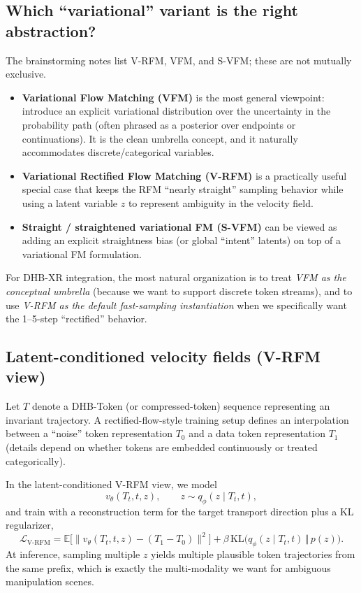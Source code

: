 \documentclass[11pt]{article}
\begin{document}
\subsection{Which ``variational'' variant is the right abstraction?}
The brainstorming notes list V-RFM, VFM, and S-VFM; these are not mutually exclusive.
\begin{itemize}
  \item \textbf{Variational Flow Matching (VFM)} is the most general viewpoint: introduce an explicit variational distribution over the uncertainty in the probability path (often phrased as a posterior over endpoints or continuations). It is the clean umbrella concept, and it naturally accommodates discrete/categorical variables.
  \item \textbf{Variational Rectified Flow Matching (V-RFM)} is a practically useful special case that keeps the RFM ``nearly straight'' sampling behavior while using a latent variable $z$ to represent ambiguity in the velocity field.
  \item \textbf{Straight / straightened variational FM (S-VFM)} can be viewed as adding an explicit straightness bias (or global ``intent'' latents) on top of a variational FM formulation.
\end{itemize}

For DHB-XR integration, the most natural organization is to treat \emph{VFM as the conceptual umbrella} (because we want to support discrete token streams), and to use \emph{V-RFM as the default fast-sampling instantiation} when we specifically want the 1--5-step ``rectified'' behavior.

\subsection{Latent-conditioned velocity fields (V-RFM view)}
Let $T$ denote a DHB-Token (or compressed-token) sequence representing an invariant trajectory. A rectified-flow-style training setup defines an interpolation between a ``noise'' token representation $T_0$ and a data token representation $T_1$ (details depend on whether tokens are embedded continuously or treated categorically).

In the latent-conditioned V-RFM view, we model
\begin{equation}
  v_{\theta}(T_t, t, z), \qquad z\sim q_{\phi}(z\mid T_t,t),
\end{equation}
and train with a reconstruction term for the target transport direction plus a KL regularizer,
\begin{equation}
  \mathcal{L}_{\mathrm{V\text{-}RFM}} = \mathbb{E}\bigl[\lVert v_{\theta}(T_t,t,z) - (T_1 - T_0)\rVert^2\bigr] + \beta\,\mathrm{KL}\bigl(q_{\phi}(z\mid T_t,t)\,\Vert\,p(z)\bigr).
\end{equation}
At inference, sampling multiple $z$ yields multiple plausible token trajectories from the same prefix, which is exactly the multi-modality we want for ambiguous manipulation scenes.
\end{document}
